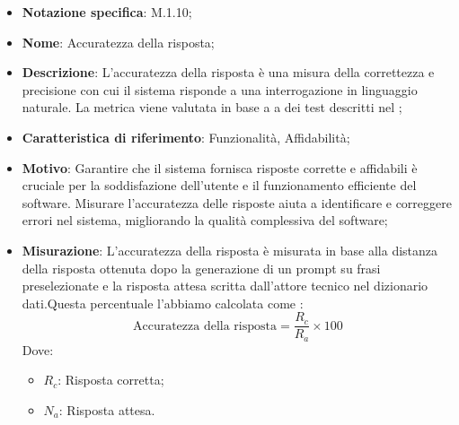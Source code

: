 \begin{itemize}
    \item \textbf{Notazione specifica}: M.1.10;
    \item \textbf{Nome}: Accuratezza della risposta;
    \item \textbf{Descrizione}: L'accuratezza della risposta è una misura della correttezza e precisione con cui il sistema risponde a una interrogazione in linguaggio naturale. La metrica viene valutata in base a a dei test descritti nel ;
    \item \textbf{Caratteristica di riferimento}: Funzionalità, Affidabilità;
    \item \textbf{Motivo}: Garantire che il sistema fornisca risposte corrette e affidabili è cruciale per la soddisfazione dell'utente e il funzionamento efficiente del software. Misurare l'accuratezza delle risposte aiuta a identificare e correggere errori nel sistema, migliorando la qualità complessiva del software;
    \item \textbf{Misurazione}: L'accuratezza della risposta è misurata in base alla distanza della risposta ottenuta dopo la generazione di un prompt su frasi preselezionate e la risposta attesa scritta dall'attore tecnico nel dizionario dati.Questa percentuale l'abbiamo calcolata come :
    \[
    \text{Accuratezza della risposta} = \frac{R_{c}}{R_{a}} \times 100
    \]
    Dove:
    \begin{itemize}
        \item $R_{c}$: Risposta corretta;
        \item $N_{a}$: Risposta attesa.
    \end{itemize}
 \end{itemize}
